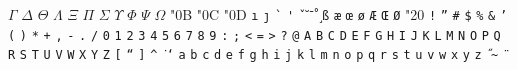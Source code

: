 \documentclass{article}
\begin{document}
\noindent $\mathtt{\Gamma}$ $\mathtt{\Delta}$ $\mathtt{\Theta}$ $\mathtt{\Lambda}$ $\mathtt{\Xi}$ $\mathtt{\Pi}$ $\mathtt{\Sigma}$ $\mathtt{\Upsilon}$ $\mathtt{\Phi}$ $\mathtt{\Psi}$ $\mathtt{\Omega}$ \selectfont\char"0B \selectfont\char"0C \selectfont\char"0D \texttt{\textexclamdown} \texttt{\textquestiondown} \texttt{\i} \texttt{\j} \texttt{\`} \texttt{\'} \texttt{\v} \texttt{\u} \texttt{\=} \texttt{\r} \texttt{\c} \texttt{\ss} \texttt{\ae} \texttt{\oe} \texttt{\o} \texttt{\AE} \texttt{\OE} \texttt{\O} \selectfont\char"20 \texttt{!} \texttt{\textquotedblright} \texttt{\#} \texttt{\$} \texttt{\%} \texttt{\&} \texttt{'} \texttt{(} \texttt{)} \texttt{*} \texttt{+} \texttt{,} \texttt{-} \texttt{.} \texttt{/} \texttt{0} \texttt{1} \texttt{2} \texttt{3} \texttt{4} \texttt{5} \texttt{6} \texttt{7} \texttt{8} \texttt{9} \texttt{:} \texttt{;} \texttt{<} \texttt{=} \texttt{>} \texttt{?} \texttt{@} \texttt{A} \texttt{B} \texttt{C} \texttt{D} \texttt{E} \texttt{F} \texttt{G} \texttt{H} \texttt{I} \texttt{J} \texttt{K} \texttt{L} \texttt{M} \texttt{N} \texttt{O} \texttt{P} \texttt{Q} \texttt{R} \texttt{S} \texttt{T} \texttt{U} \texttt{V} \texttt{W} \texttt{X} \texttt{Y} \texttt{Z} \texttt{[} \texttt{\textquotedblleft} \texttt{]} \texttt{\^} \texttt{\.} \texttt{\textquoteleft} \texttt{a} \texttt{b} \texttt{c} \texttt{d} \texttt{e} \texttt{f} \texttt{g} \texttt{h} \texttt{i} \texttt{j} \texttt{k} \texttt{l} \texttt{m} \texttt{n} \texttt{o} \texttt{p} \texttt{q} \texttt{r} \texttt{s} \texttt{t} \texttt{u} \texttt{v} \texttt{w} \texttt{x} \texttt{y} \texttt{z} \texttt{\textendash} \texttt{\textemdash} \texttt{\H} \texttt{\~} \texttt{\"}\\
\end{document}
